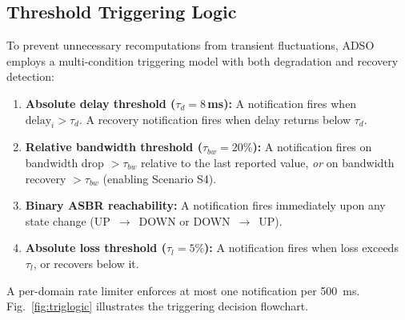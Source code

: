\documentclass[conference]{IEEEtran}
\begin{document}
\subsection{Threshold Triggering Logic}

To prevent unnecessary recomputations from transient fluctuations,
ADSO employs a multi-condition triggering model with both degradation
and recovery detection:

\begin{enumerate}
  \item \textbf{Absolute delay threshold ($\tau_d = 8$\,ms):} A
        notification fires when $\text{delay}_i > \tau_d$. A recovery
        notification fires when delay returns below $\tau_d$.

  \item \textbf{Relative bandwidth threshold ($\tau_{bw} = 20\%$):}
        A notification fires on bandwidth drop $> \tau_{bw}$ relative
        to the last reported value, \emph{or} on bandwidth recovery
        $> \tau_{bw}$ (enabling Scenario S4).

  \item \textbf{Binary ASBR reachability:} A notification fires
        immediately upon any state change (UP~$\to$~DOWN or
        DOWN~$\to$~UP).

  \item \textbf{Absolute loss threshold ($\tau_l = 5\%$):} A
        notification fires when loss exceeds $\tau_l$, or recovers
        below it.
\end{enumerate}

A per-domain rate limiter enforces at most one notification per 500~ms.
Fig.~\ref{fig:triglogic} illustrates the triggering decision flowchart.
\end{document}

